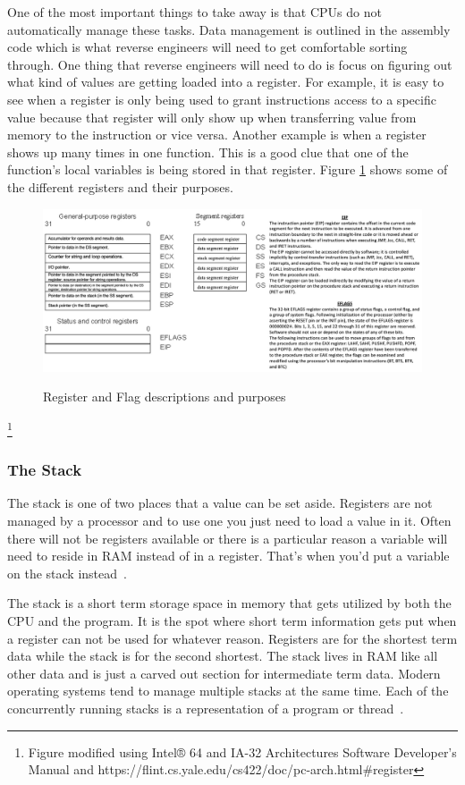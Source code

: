 One of the most important things to take away is that CPUs do not automatically manage these tasks. 
Data management is outlined in the assembly code which is what reverse engineers will need to get comfortable sorting through.
One thing that reverse engineers will need to do is focus on figuring out what kind of values are getting loaded into a register. 
For example, it is easy to see when a register is only being used to grant instructions access to a specific value because that register will only show up when transferring value from memory to the instruction or vice versa.
Another example is when a register shows up many times in one function. 
This is a good clue that one of the function's local variables is being stored in that register. Figure \ref{fig:registerdiagram} shows some of the different registers and their purposes.
\begin{figure}[H]
	\caption{Register and Flag descriptions and purposes}
	\includegraphics[scale=.27]{Register Diagram.jpeg}
    \label{fig:registerdiagram}
\end{figure}
\footnote{Figure modified using Intel® 64 and IA-32 Architectures Software Developer’s Manual and https://flint.cs.yale.edu/cs422/doc/pc-arch.html\#register}

\subsubsection{The Stack}
The stack is one of two places that a value can be set aside. 
Registers are not managed by a processor and to use one you just need to load a value in it. 
Often there will not be registers available or there is a particular reason a variable will need to reside in RAM instead of in a register. 
That’s when you’d put a variable on the stack instead~\cite{Reversing}.

The stack is a short term storage space in memory that gets utilized by both the CPU and the program. 
It is the spot where short term information gets put when a register can not be used for whatever reason. 
Registers are for the shortest term data while the stack is for the second shortest. 
The stack lives in RAM like all other data and is just a carved out section for intermediate term data. 
Modern operating systems tend to manage multiple stacks at the same time. 
Each of the concurrently running stacks is a representation of a program or thread~\cite{MasteringRE}.

